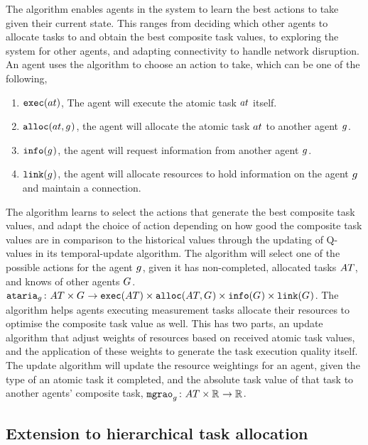 The \acronymATARIAExtended{}{} algorithm enables agents in the system to learn the best actions to take given their current state. This ranges from deciding which other agents to allocate tasks to and obtain the best composite task values, to exploring the system for other agents, and adapting connectivity to handle network disruption. An agent uses the \acronymATARIA{}{} algorithm to choose an action to take, which can be one of the following,
\begin{enumerate}
	\item $\functionExec{}{}$, The agent will execute the atomic task $\varAtomicTask{}{}$ itself.
	\item $\functionAlloc{}{}$, the agent will allocate the atomic task $\varAtomicTask{}{}$ to another agent $g_{}^{}$.
	\item $\texttt{info}(g_{}^{})$, the agent will request information from another agent $g_{}^{}$.
	\item $\texttt{link}(g_{}^{})$, the agent will allocate resources to hold information on the agent $g_{}^{}$ and maintain a connection.
\end{enumerate}
The \acronymATARIA{}{} algorithm learns to select the actions that generate the best composite task values, and adapt the choice of action depending on how good the composite task values are in comparison to the historical values through the updating of Q-values in its temporal-update algorithm. The algorithm will select one of the possible actions for the agent $g_{}^{}$, given it has non-completed, allocated tasks $\setAtomicTask{}{}$, and knows of other agents $G_{}^{}$. $\label{eq:ataria}\formalATARIA{}{}$.
The \acronymMGRAOExtended{}{} algorithm helps agents executing measurement tasks allocate their resources to optimise the composite task value as well. This has two parts, an update algorithm that adjust weights of resources based on received atomic task values, and the application of these weights to generate the task execution quality itself. The update algorithm will update the resource weightings for an agent, given the type of an atomic task it completed, and the absolute task value of that task to another agents' composite task, $\label{eq:mgrao}\formalMGRAO{}{}$.



\subsection{Extension to hierarchical task allocation}

